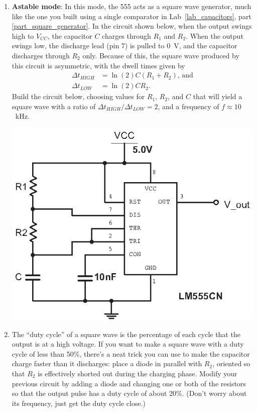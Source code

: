 \begin{enumerate}[wide]
\item \textbf{Astable mode}: In this mode, the 555 acts as a square wave generator, much like the one you built using a single comparator in Lab~\ref{lab_capacitors}, part \ref{part_square_generator}.  In the circuit shown below, when the output swings high to $V_{CC}$, the capacitor $C$ charges through $R_1$ and $R_2$.  When the output swings low, the discharge lead (pin 7) is pulled to 0~V, and the capacitor discharges through $R_2$ only.  Because of this, the square wave produced by this circuit is asymmetric, with the dwell times given by
\begin{align*}
\Delta t_{HIGH} &= \ln (2) C(R_1 + R_2) \textrm{, and} \\
\Delta t_{LOW} &=\ln (2) CR_2.
\end{align*}
Build the circuit below, choosing values for $R_1$, $R_2$, and $C$ that will yield a square wave with a ratio of 
$\Delta t_{HIGH} / \Delta t_{LOW} =2$, and a frequency of $f \approx 10$~kHz. \label{part_astable}
\begin{center}
\includegraphics{timers/astable_555.eps}
\end{center}

\item The ``duty cycle'' of a square wave is the percentage of each cycle that the output is at a high voltage.  If you want to make a square wave with a duty cycle of less than 50\%, there's a neat trick you can use to make the capacitor charge faster than it discharges: place a diode in parallel with $R_2$, oriented so that $R_2$ is effectively shorted out during the charging phase.  Modify your previous circuit by adding a diode and changing one or both of the resistors so that the output pulse has a duty cycle of about 20\%.  (Don't worry about its frequency, just get the duty cycle close.)


\end{enumerate}

